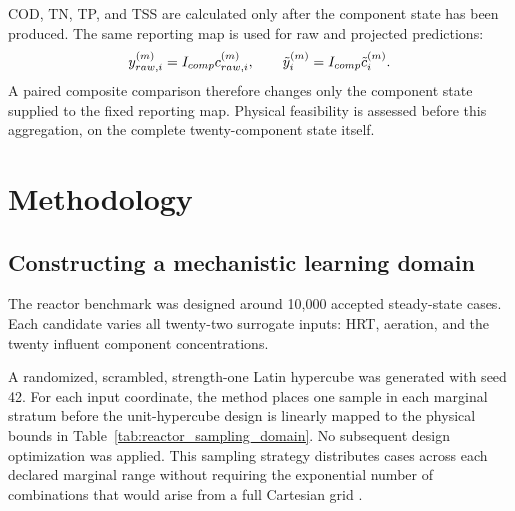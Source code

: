 COD, TN, TP, and TSS are calculated only after the component state has been produced. The same reporting map is used for raw and projected predictions:
\begin{equation}
\equationname{Raw and projected water-quality composites}
y_{raw,i}^{(m)}=I_{comp}c_{raw,i}^{(m)},\qquad
\tilde y_i^{(m)}=I_{comp}\tilde c_i^{(m)}.
\label{eq:projection_paired_composites}
\end{equation}
A paired composite comparison therefore changes only the component state supplied to the fixed reporting map. Physical feasibility is assessed before this aggregation, on the complete twenty-component state itself.

\section{Methodology}

\subsection{Constructing a mechanistic learning domain}

The reactor benchmark was designed around 10,000 accepted steady-state cases. Each candidate varies all twenty-two surrogate inputs: HRT, aeration, and the twenty influent component concentrations.

A randomized, scrambled, strength-one Latin hypercube was generated with seed 42. For each input coordinate, the method places one sample in each marginal stratum before the unit-hypercube design is linearly mapped to the physical bounds in Table~\ref{tab:reactor_sampling_domain}. No subsequent design optimization was applied. This sampling strategy distributes cases across each declared marginal range without requiring the exponential number of combinations that would arise from a full Cartesian grid \citep{McKay1979}.


